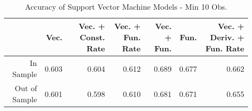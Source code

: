 \begin{table}[ht]
\centering
\begin{tabular}{rrrrrrr}
  \hline
 & Vec. & Vec. + Const. Rate & Vec. + Fun. Rate & Vec. + Fun. & Fun. & Vec. + Deriv. + Fun. Rate \\ 
  \hline
In Sample & 0.603 & 0.604 & 0.612 & 0.689 & 0.677 & 0.662 \\ 
  Out of Sample & 0.601 & 0.598 & 0.610 & 0.681 & 0.671 & 0.655 \\ 
   \hline
\end{tabular}
\caption{Accuracy of Support Vector Machine Models - Min 10 Obs.} 
\label{svm_10obs_acc}
\end{table}
